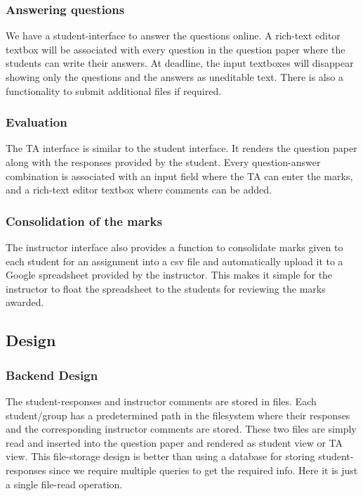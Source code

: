 \subsubsection{Answering questions}
We have a student-interface to answer the questions online. A rich-text editor textbox will be associated with every question in the question paper where the students can write their answers. At deadline, the input textboxes will disappear showing only the questions and the answers as uneditable text. There is also a functionality to submit additional files if required.

\subsubsection{Evaluation}
The TA interface is similar to the student interface. It renders the question paper along with the responses provided by the student. Every question-answer combination is associated with an input field where the TA can enter the marks, and a rich-text editor textbox where comments can be added.

\subsubsection{Consolidation of the marks}
The instructor interface also provides a function to consolidate marks given to each student for an assignment into a csv file and  automatically upload it to a Google spreadsheet provided by the instructor. This makes it simple for the instructor to float the spreadsheet to the students for reviewing the marks awarded.


\subsection{Design}
\subsubsection{Backend Design}
The student-responses and instructor comments are stored in files. Each student/group has a predetermined path in the filesystem where their responses and the corresponding instructor comments are stored. These two files are simply read and inserted into the question paper and rendered as student view or TA view. This file-storage design is better than using a database for storing student-responses since we require multiple queries to get the required info. Here it is just a single file-read operation.

